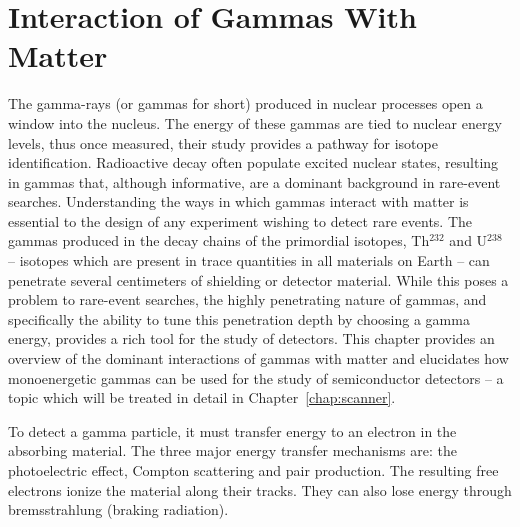 \chapter{Interaction of Gammas With Matter}\label{chap:gammas}
The gamma-rays (or gammas for short) produced in nuclear processes open a window into the nucleus. The energy of these gammas are tied to nuclear energy levels, thus once measured, their study provides a pathway for isotope identification. Radioactive decay often populate excited nuclear states, resulting in gammas that, although informative, are a dominant background in rare-event searches. Understanding the ways in which gammas interact with matter is essential to the design of any experiment wishing to detect rare events. The gammas produced in the decay chains of the primordial isotopes, Th$^{232}$ and U$^{238}$ -- isotopes which are present in trace quantities in all materials on Earth -- can penetrate several centimeters of shielding or detector material. While this poses a problem to rare-event searches, the highly penetrating nature of gammas, and specifically the ability to tune this penetration depth by choosing a gamma energy, provides a rich tool for the study of detectors. This chapter provides an overview of the dominant interactions of gammas with matter and elucidates how monoenergetic gammas can be used for the study of semiconductor detectors -- a topic which will be treated in detail in Chapter~\ref{chap:scanner}.


To detect a gamma particle, it must transfer energy to an electron in the absorbing material. The three major energy transfer mechanisms are: the photoelectric effect, Compton scattering and pair production. The resulting free electrons ionize the material along their tracks. They can also lose energy through bremsstrahlung (braking radiation). 

